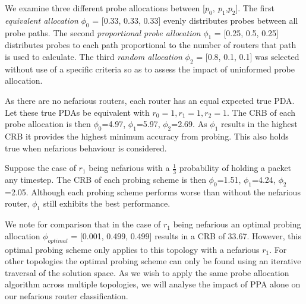 We examine three different probe allocations between [$p_0,\:p_1$,\:$p_2$]. The first \textit{equivalent allocation} $\phi_0$ = [0.33, 0.33, 0.33] evenly distributes probes between all probe paths. The second \textit{proportional probe allocation} $\phi_1$ = [0.25, 0.5, 0.25] distributes probes to each path proportional to the number of routers that path is used to calculate. The third \textit{random allocation} $\phi_2$ = [0.8, 0.1, 0.1] was selected without use of a specific criteria so as to assess the impact of uninformed probe allocation.\par
As there are no nefarious routers, each router has an equal expected true PDA. Let these true PDAs be equivalent with $r_0=1, r_1=1, r_2=1$. The CRB of each probe allocation is then $\phi_0$=4.97, $\phi_1$=5.97, $\phi_2$=2.69. As $\phi_1$ results in the highest CRB it provides the highest minimum accuracy from probing. This also holds true when nefarious behaviour is considered.\par
Suppose the case of $r_1$ being nefarious with a $\frac{1}{3}$ probability of holding a packet any timestep. The CRB of each probing scheme is then $\phi_0$=1.51, $\phi_1$=4.24, $\phi_2$=2.05. Although each probing scheme performs worse than without the nefarious router, $\phi_1$ still exhibits the best performance.\par
We note for comparison that in the case of $r_1$ being nefarious an optimal probing allocation $\phi_{optimal}$ = [0.001, 0.499, 0.499] results in a CRB of 33.67. However, this optimal probing scheme only applies to this topology with a nefarious $r_1$. For other topologies the optimal probing scheme can only be found using an iterative traversal of the solution space. As we wish to apply the same probe allocation algorithm across multiple topologies, we will analyse the impact of PPA alone on our nefarious router classification.

